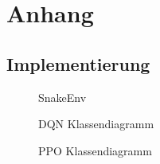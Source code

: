 \chapter{Anhang}

\section{Implementierung}
\begin{figure}[H]
	\centering
	
	\caption[SnakeEnv Klassendiagramm]{SnakeEnv}
	\label{fig:Anhang_SnakeEnv}
\end{figure}
\newpage
\begin{figure}[H]
	\centering
	
	\caption[DQN Klassendiagramm]{DQN Klassendiagramm}
	\label{fig:Anhang_DQN_Klassendiagramm}
\end{figure}
\begin{figure}[H]
	\centering
	
	\caption[PPO Klassendiagramm]{PPO Klassendiagramm}
	\label{fig:Anhang_PPO_Klassendiagramm}
\end{figure}